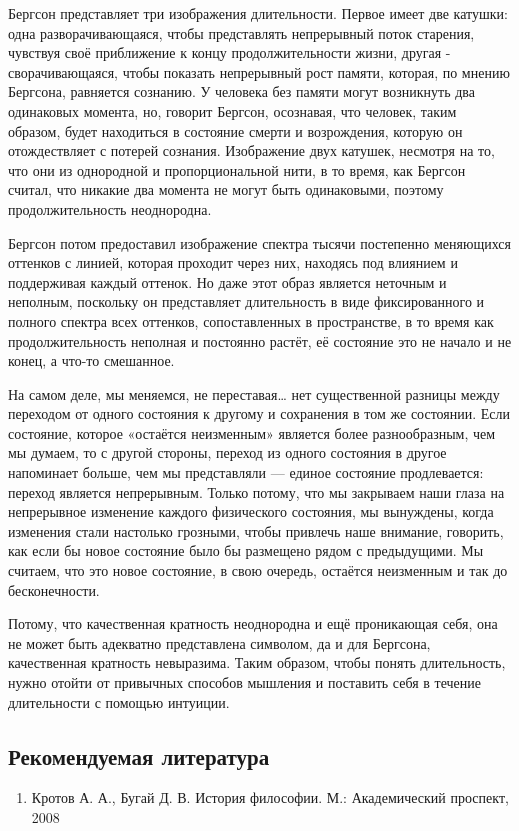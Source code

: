 \documentclass{article}
\begin{document}
\begin{flushleft}
Бергсон представляет три изображения длительности. Первое имеет две катушки: одна разворачивающаяся, чтобы представлять непрерывный поток старения, чувствуя своё приближение к концу продолжительности жизни, другая - сворачивающаяся, чтобы показать непрерывный рост памяти, которая, по мнению Бергсона, равняется сознанию. У человека без памяти могут возникнуть два одинаковых момента, но, говорит Бергсон, осознавая, что человек, таким образом, будет находиться в состояние смерти и возрождения, которую он отождествляет с потерей сознания. Изображение двух катушек, несмотря на то, что они из однородной и пропорциональной нити, в то время, как Бергсон считал, что никакие два момента не могут быть одинаковыми, поэтому продолжительность неоднородна.

Бергсон потом предоставил изображение спектра тысячи постепенно меняющихся оттенков с линией, которая проходит через них, находясь под влиянием и поддерживая каждый оттенок. Но даже этот образ является неточным и неполным, поскольку он представляет длительность в виде фиксированного и полного спектра всех оттенков, сопоставленных в пространстве, в то время как продолжительность неполная и постоянно растёт, её состояние это не начало и не конец, а что-то смешанное.

На самом деле, мы меняемся, не переставая… нет существенной разницы между переходом от одного состояния к другому и сохранения в том же состоянии. Если состояние, которое «остаётся неизменным» является более разнообразным, чем мы думаем, то с другой стороны, переход из одного состояния в другое напоминает больше, чем мы представляли — единое состояние продлевается: переход является непрерывным. Только потому, что мы закрываем наши глаза на непрерывное изменение каждого физического состояния, мы вынуждены, когда изменения стали настолько грозными, чтобы привлечь наше внимание, говорить, как если бы новое состояние было бы размещено рядом с предыдущими. Мы считаем, что это новое состояние, в свою очередь, остаётся неизменным и так до бесконечности.

Потому, что качественная кратность неоднородна и ещё проникающая себя, она не может быть адекватно представлена символом, да и для Бергсона, качественная кратность невыразима. Таким образом, чтобы понять длительность, нужно отойти от привычных способов мышления и поставить себя в течение длительности с помощью интуиции.

\pagebreak
\subsection{Рекомендуемая литература}

\begin{enumerate}
    \item Кротов А. А., Бугай Д. В. История философии. М.: Академический проспект, 2008
\end{enumerate}

\end{flushleft}
\end{document}
